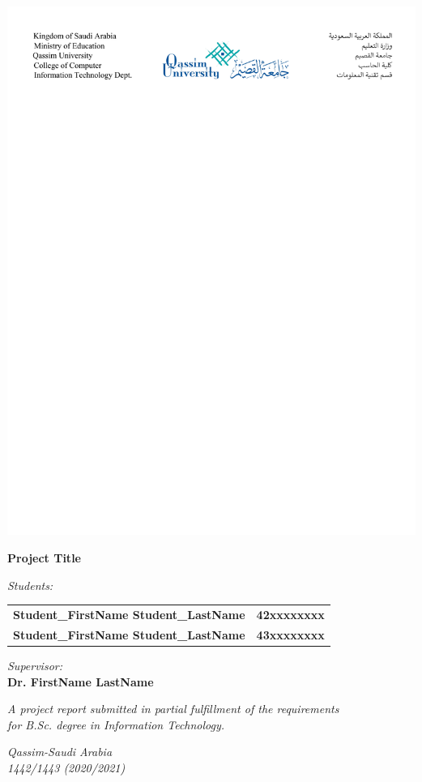 \documentclass[11pt,a4paper]{report}
\newcommand{\supervisorname}{\textbf{Dr. FirstName LastName}}
\newcommand{\firststudentname}{\textbf{Student\_FirstName Student\_LastName}}
\newcommand{\firststudentid}{\textbf{42xxxxxxxx}}
\newcommand{\secondstudentname}{\textbf{Student\_FirstName Student\_LastName}}
\newcommand{\secindstudentid}{\textbf{43xxxxxxxx}}
\begin{document}
\begin{titlepage}

\begin{center}
\includegraphics[width=\textwidth]{figures/essentials/header.pdf}
\end{center}

\begin{center}
\vspace{3cm}
\huge
\textbf{Project Title}

\Large
\vspace{3cm}
\textit{Students:}\\
\Large


\begin{tabular}{lr}
{\firststudentname} & {\firststudentid} \\
{\secondstudentname} & {\secindstudentid}
\end{tabular}

\vspace{3cm}
\Large
\textit{Supervisor:}\\
{\supervisorname}

\end{center}
\vfill
\begin{center}	
\textit{A project report submitted in partial fulfillment of the requirements \\
for B.Sc. degree in Information Technology.}
\vspace{5mm}

\textit{Qassim-Saudi Arabia\\
1442/1443 (2020/2021)}

\end{center}
\end{titlepage}
\end{document}
